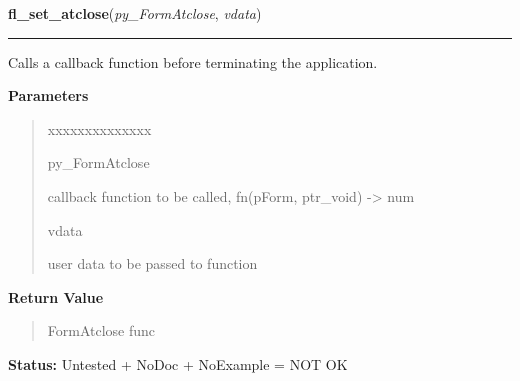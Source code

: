 \hspace{.8\funcindent}\begin{boxedminipage}{\funcwidth}

    \raggedright \textbf{fl\_set\_atclose}(\textit{py\_FormAtclose}, \textit{vdata})

    \vspace{-1.5ex}

    \rule{\textwidth}{0.5\fboxrule}
\setlength{\parskip}{2ex}
    Calls a callback function before terminating the application.

\setlength{\parskip}{1ex}
      \textbf{Parameters}
      \vspace{-1ex}

      \begin{quote}
        \begin{Ventry}{xxxxxxxxxxxxxx}

          \item[py\_FormAtclose]

          callback function to be called, fn(pForm, ptr\_void) 
          -{\textgreater} num

          \item[vdata]

          user data to be passed to function

        \end{Ventry}

      \end{quote}

      \textbf{Return Value}
    \vspace{-1ex}

      \begin{quote}
      FormAtclose func

      \end{quote}

\textbf{Status:} Untested + NoDoc + NoExample = NOT OK



    \end{boxedminipage}

    \label{xformslib:library:fl_set_form_atactivate}

    \vspace{0.5ex}

